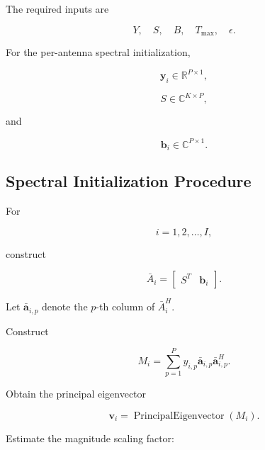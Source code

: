 \documentclass[12pt,a4paper]{article}
\begin{document}
The required inputs are

\begin{equation}
\boxed{
Y,\quad S,\quad B,\quad T_{\max},\quad \epsilon
}.
\tag{346}
\end{equation}

For the per-antenna spectral initialization,

\begin{equation}
\mathbf y_i
\in
\mathbb R^{P\times1},
\tag{347}
\end{equation}

\begin{equation}
S
\in
\mathbb C^{K\times P},
\tag{348}
\end{equation}

and

\begin{equation}
\mathbf b_i
\in
\mathbb C^{P\times1}.
\tag{349}
\end{equation}

\subsection{Spectral Initialization Procedure}

For

\begin{equation}
i=1,2,\ldots,I,
\tag{350}
\end{equation}

construct

\begin{equation}
\boxed{
\bar A_i
=
\begin{bmatrix}
S^T & \mathbf b_i
\end{bmatrix}
}.
\tag{351}
\end{equation}

Let $\bar{\mathbf a}_{i,p}$ denote the $p$-th column of $\bar A_i^H$.

Construct

\begin{equation}
\boxed{
M_i
=
\sum_{p=1}^{P}
y_{i,p}
\bar{\mathbf a}_{i,p}
\bar{\mathbf a}_{i,p}^{H}
}.
\tag{352}
\end{equation}

Obtain the principal eigenvector

\begin{equation}
\boxed{
\mathbf v_i
=
\operatorname{PrincipalEigenvector}(M_i)
}.
\tag{353}
\end{equation}

Estimate the magnitude scaling factor:
\end{document}
